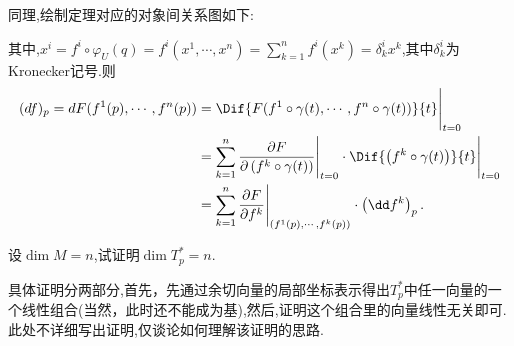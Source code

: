 \begin{remark}
同理,绘制定理对应的对象间关系图如下:
\begin{center}
\end{center}
其中,$x^i=f^i\circ \varphi_U(q)=f^i (x^1,\cdots,x^n)=\sum_{k=1}^{n}f^i(x^k)=\delta_k^i x^k$,其中$\delta_k^i$为Kronecker记号.则
\begin{align*}
(df)_p=dF(f^1(p),\cdots,f^n (p))&=\Dif{F(f^1\circ \gamma(t),\cdots,f^n\circ\gamma(t))}{t}\Bigg|_{t=0}\\ 
&=\sum_{k=1}^{n}\frac{\partial F}{\partial \left(f^k\circ \gamma(t)\right)}\Bigg|_{t=0}\cdot \Dif{\left(f^k\circ\gamma(t)\right)}{t}\Bigg|_{t=0}\\ 
&=\sum_{k=1}^{n}\frac{\partial F}{\partial f^k}\Bigg|_{(f^1(p),\cdots,f^k(p))}\cdot \left(\dd f^k\right)_p.
\end{align*}
\end{remark}

\begin{example}
设$\dim M=n$,试证明$\dim T_p^*=n$.
\end{example}
具体证明分两部分,首先，先通过余切向量的局部坐标表示得出$T_p^*$中任一向量的一个线性组合(当然，此时还不能成为基),然后,证明这个组合里的向量线性无关即可.此处不详细写出证明,仅谈论如何理解该证明的思路.

